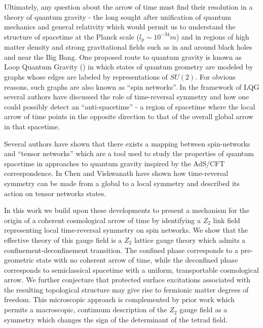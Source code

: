 \documentclass[preprint]{SciPost}
\theoremstyle{plain} %
\begin{document}
Ultimately, any question about the arrow of time must find their resolution in a theory of quantum gravity - the long sought after unification of quantum mechanics and general relativity which would permit us to understand the structure of spacetime at the Planck scale ($ l_p \sim 10^{-34}m $) and in regions of high matter density and strong gravitational fields such as in and around black holes and near the Big Bang. One proposed route to quantum gravity is known as Loop Quantum Gravity (\cite{Vaid2016LQG-for-the-Bewildered}) in which states of quantum geometry are modeled by graphs whose edges are labeled by representations of $ SU(2) $. For obvious reasons, such graphs are also known as ``spin networks''. In the framework of LQG several authors have discussed the role of time-reversal symmetry \cite{Christodoulou2012How-to-detect,Rovelli2012Discrete} and how one could possibly detect an ``anti-spacetime'' - a region of spacetime where the local arrow of time points in the opposite direction to that of the overall global arrow in that spacetime.

Several authors \cite{Qi2013Exact,Han2016Loop,Chirco2018Group,Colafranceschi2021Holographic,Chirco2022Quantum} have shown that there exists a mapping between spin-networks and ``tensor networks'' which are a tool used to study the properties of quantum spacetime in approaches to quantum gravity inspired by the AdS/CFT correspondence. In \cite{Chen2015Gauging} Chen and Vishwanath have shown how time-reversal symmetry can be made from a global to a local symmetry and described its action on tensor networks states.

In this work we build upon these developments to present a mechanism for the origin of a coherent cosmological arrow of time by identifying a $ Z_2 $ link field representing local time-reversal symmetry on spin networks. We show that the effective theory of this gauge field is a $ Z_2 $ lattice gauge theory which admits a confinement-deconfinement transition. The confined phase corresponds to a pre-geometric state with no coherent arrow of time, while the deconfined phase corresponds to semiclassical spacetime with a uniform, transportable cosmological arrow. We further conjecture that protected surface excitations associated with the resulting topological structure may give rise to fermionic matter degrees of freedom. This microscopic approach is complemented by prior work \cite{Christodoulou2012How-to-detect,Rovelli2012Discrete} which permits a macroscopic, continuum description of the $ Z_2 $ gauge field as a symmetry which changes the sign of the determinant of the tetrad field.
\end{document}
